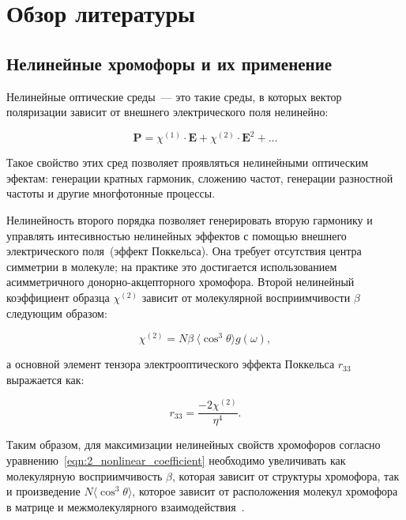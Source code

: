 \section{Обзор литературы}

\subsection{Нелинейные хромофоры и их применение}

Нелинейные оптические среды~--- это такие среды, в которых вектор поляризации зависит от внешнего электрического поля нелинейно:

\begin{equation}
    \mathbf{P} = \chi^{(1)}\cdot\mathbf{E} + \chi^{(2)}\cdot\mathbf{E}^2 + \ldots
\end{equation}

Такое свойство этих сред позволяет проявляться нелинейными оптическим эфектам: генерации кратных гармоник, сложению частот, генерации разностной частоты и другие многфотонные процессы.

Нелинейность второго порядка позволяет генерировать вторую гармонику и управлять интесивностью нелинейных эффектов с помощью внешнего электрического поля~(эффект Поккельса). Она требует отсутствия центра симметрии в молекуле; на практике это достигается использованием асимметричного донорно-акцепторного хромофора. Второй нелинейный коэффициент образца $\chi^{(2)}$ зависит от молекулярной восприимчивости $\beta$ следующим образом:

\begin{equation}
    \chi^{(2)} = N \beta\ \langle\cos^3\theta\rangle g(\omega),
    \label{eqn:2_nonlinear_coefficient}
\end{equation}

\noindent а основной элемент тензора электрооптического эффекта Поккельса $r_{33}$ выражается как:

\begin{equation}
    r_{33} = \frac{-2\chi^{(2)}}{\eta^4}.
\end{equation}

Таким образом, для максимизации нелинейных свойств хромофоров согласно уравнению~\ref{eqn:2_nonlinear_coefficient} необходимо увеличивать как молекулярную восприимчивость $\beta$, которая зависит от структуры хромофора, так и произведение $N\langle \cos^3\theta\rangle$, которое зависит от расположения молекул хромофора в матрице и межмолекулярного взаимодействия~\cite{Dalton2010a}.

